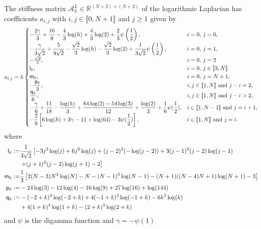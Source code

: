 \documentclass[10 pt]{article}
\newcommand\inter[1]{\llbracket #1\rrbracket}
\numberwithin{equation}{section}
\def\R{\mathbb{R}}
\begin{document}
The stiffness matrix $\mathcal A_{h}^{L}\in{\R^{(N+2)\times(N+2)}}$ of the logarithmic Laplacian has coefficients $a_{i,j}$ with $i,j\in\inter{0,N+1}$ and $j\geq 1$ given by
%
\begin{equation}\label{stiff:LogLap}
a_{i,j}= h
\begin{cases}
\displaystyle -\frac{2 \gamma }{3}+\frac{16}{9}-\frac{4}{3}  \log (h)+\frac{4}{3}  \log
   (2)+\frac{2}{3}  \psi \left(\frac{1}{2}\right), & \textnormal{$i=0$, $j=0$,} \\
\displaystyle -\frac{\gamma }{3\sqrt{2}}+\frac{5}{9\sqrt{2}}-\frac{\sqrt{2}}{3} \log (h)-\frac{\sqrt{2}}{3}  \log
   (2)+\frac{1}{3\sqrt{2}} \psi \left(\frac{1}{2}\right), & \textnormal{$i=0$, $j=1$,} \\
   -\frac{\sqrt {2}}{3},
 & \parbox[t]{.3\columnwidth}{$i=0$, $j=2$}\\
 \mathsf{l}_k, 
 & \parbox[t]{.3\columnwidth}{$i=0$, $j\in\inter{3,N}$}\\
 \mathsf{m}_k, &  \parbox[t]{.3\columnwidth}{$i=0$, $j=N+1$,}\\
\displaystyle -\frac{\mathsf p_k}{3}, & \textnormal{$i,j\in\inter{1,N}$ and $j-i=2$,} \\
\displaystyle \frac{\mathsf q_k}{6}, & \textnormal{$i,j\in\inter{1,N}$ and $j-i> 2$,} \\
\displaystyle -\frac{\gamma}{6} + \frac{11}{18} - \frac{\log(h)}{3}  + \frac{64\log(2) - 54\log(3)}{12} + \frac{\log(2)}{3}  + \frac{1}{6} \psi(\frac 12), & \textnormal{$i\in\inter{1,N-1}$ and $j=i+1$,} \\
\displaystyle -\frac{2}{9}\left[6\log(h) + 3\gamma - 11 + \log(64) - 3\psi(\frac12)\right], & \textnormal{$i\in\inter{1,N}$ and $j=i$.}
\end{cases}
\end{equation}
%
where 
%
\begin{align*} \notag
\mathsf{l}_k:= & \frac{1}{3\sqrt{2}}  \left[-3 j^3 \log (j)+6 j^2 \log (j)+(j-2)^3 (-\log (j-2))+3
   (j-1)^2 (j-2) \log (j-1) \right. \\
   &\left. +(j+1)^2 (j-2) \log (j+1)-2\right] \\
   \mathsf{m}_k:= & \frac{1}{3}\left[2 (N-3) N^2 \log (N)-N-(N-1)^3 \log (N-1)-(N+1) ((N-4) N+1) \log (N+1)-3\right] \\
\mathsf{p}_k:=&  -24\log(3) - 12\log(4) - 16\log(9) + 27\log(16) + \log(144) \\ \notag
\mathsf{q}_k:=&-(-2 + k)^3\log(-2 + k) + 4(-1 + k)^3\log(-1 + k) - 6 k^3 \log(k)  \\
&+4(1 + k)^3\log(1 + k) - (2 + k)^3\log(2 + k)
\end{align*}
and $\psi$ is the digamma function and $\gamma=-\psi(1)$
\end{document}
